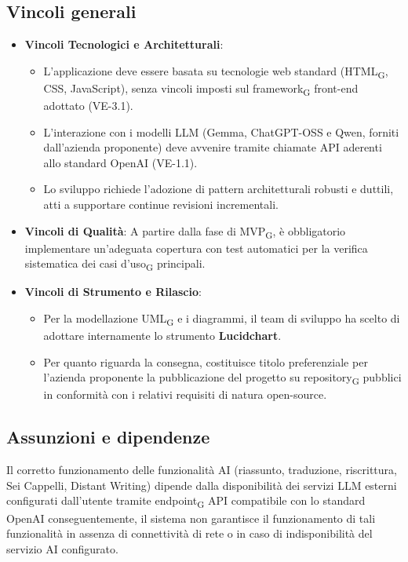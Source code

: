 \subsection{Vincoli generali}
\begin{itemize}
	\item \textbf{Vincoli Tecnologici e Architetturali}:
        \begin{itemize}
            \item L'applicazione deve essere basata su tecnologie web standard (HTML\textsubscript{G}, CSS, JavaScript), senza vincoli imposti sul framework\textsubscript{G} front-end adottato (VE-3.1).
            \item L'interazione con i modelli LLM (Gemma, ChatGPT-OSS e Qwen, forniti dall'azienda proponente) deve avvenire tramite chiamate API aderenti allo standard OpenAI (VE-1.1).
            \item Lo sviluppo richiede l'adozione di pattern architetturali robusti e duttili, atti a supportare continue revisioni incrementali.
        \end{itemize} 
        
	\item \textbf{Vincoli di Qualità}: A partire dalla fase di MVP\textsubscript{G}, è obbligatorio implementare un'adeguata copertura con test automatici per la verifica sistematica dei casi d'uso\textsubscript{G} principali.
	\item \textbf{Vincoli di Strumento e Rilascio}: 
        \begin{itemize}
            \item Per la modellazione UML\textsubscript{G} e i diagrammi, il team di sviluppo ha scelto di adottare internamente lo strumento \textbf{Lucidchart}. 
            \item Per quanto riguarda la consegna, costituisce titolo preferenziale per l'azienda proponente la pubblicazione del progetto su repository\textsubscript{G} pubblici in conformità con i relativi requisiti di natura open-source.
            \end{itemize}
\end{itemize}

\subsection{Assunzioni e dipendenze}
Il corretto funzionamento delle funzionalità AI (riassunto, traduzione, riscrittura, Sei Cappelli, Distant Writing) dipende dalla disponibilità dei servizi LLM esterni configurati dall'utente tramite endpoint\textsubscript{G} API compatibile con lo standard OpenAI conseguentemente, il sistema non garantisce il funzionamento di tali funzionalità in assenza di connettività di rete o in caso di indisponibilità del servizio AI configurato.